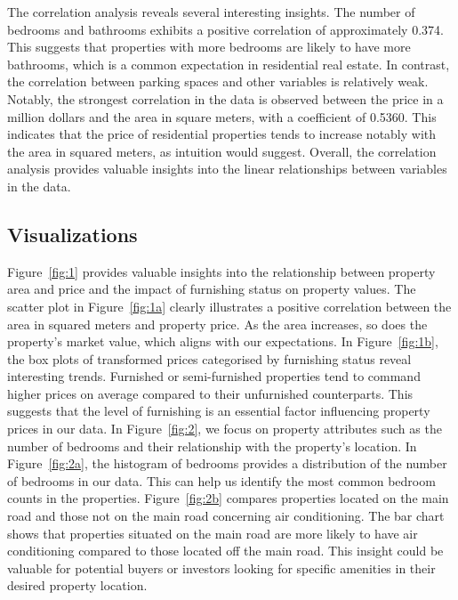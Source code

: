 \documentclass[10pt]{article}
\begin{document}
The correlation analysis reveals several interesting insights. The number of bedrooms and bathrooms exhibits a positive correlation of approximately 0.374. This suggests that properties with more bedrooms are likely to have more bathrooms, which is a common expectation in residential real estate. In contrast, the correlation between parking spaces and other variables is relatively weak. Notably, the strongest correlation in the data is observed between the price in a million dollars and the area in square meters, with a coefficient of 0.5360. This indicates that the price of residential properties tends to increase notably with the area in squared meters, as intuition would suggest. Overall, the correlation analysis provides valuable insights into the linear relationships between variables in the data.

\subsection{Visualizations}

Figure~\ref{fig:1}  provides valuable insights into the relationship between property area and price and the impact of furnishing status on property values. The scatter plot in Figure~\ref{fig:1a} clearly illustrates a positive correlation between the area in squared meters and property price. As the area increases, so does the property's market value, which aligns with our expectations. In Figure~\ref{fig:1b}, the box plots of transformed prices categorised by furnishing status reveal interesting trends. Furnished or semi-furnished properties tend to command higher prices on average compared to their unfurnished counterparts. This suggests that the level of furnishing is an essential factor influencing property prices in our data. In Figure~\ref{fig:2}, we focus on property attributes such as the number of bedrooms and their relationship with the property's location. In Figure~\ref{fig:2a}, the histogram of bedrooms provides a distribution of the number of bedrooms in our data. This can help us identify the most common bedroom counts in the properties. Figure~\ref{fig:2b} compares properties located on the main road and those not on the main road concerning air conditioning. The bar chart shows that properties situated on the main road are more likely to have air conditioning compared to those located off the main road. This insight could be valuable for potential buyers or investors looking for specific amenities in their desired property location.
\end{document}
